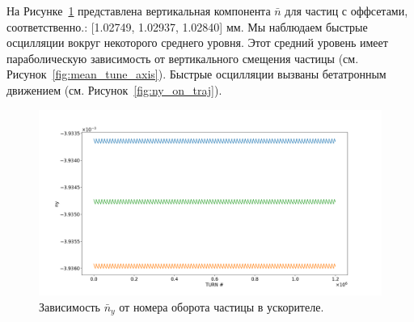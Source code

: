 На Рисунке~\ref{fig:ny_vs_turn} представлена вертикальная компонента $\bar n$ для частиц с оффсетами,
соответственно.: [1.02749, 1.02937, 1.02840] мм. Мы наблюдаем быстрые осцилляции вокруг некоторого среднего уровня. Этот средний уровень имеет параболическую зависимость от вертикального смещения частицы (см. Рисунок~\ref{fig:mean_tune_axis}). Быстрые осцилляции вызваны бетатронным движением (см. Рисунок~\ref{fig:ny_on_traj}).

\begin{figure}[h!]
	\centering
	\includegraphics[width=\linewidth]{images/decoh_sim/ny_vs_turn}
	\caption{Зависимость $\bar n_y$ от номера оборота частицы в ускорителе.\label{fig:ny_vs_turn}}
\end{figure}

